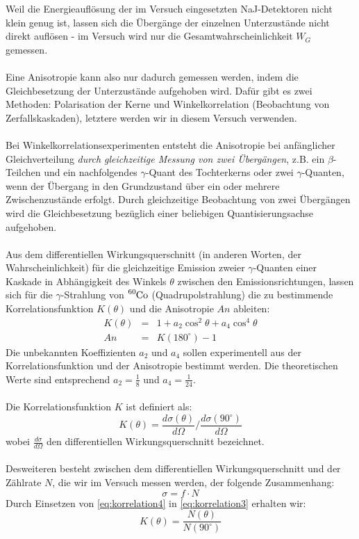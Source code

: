 \documentclass[a4paper,titlepage]{scrartcl}
\numberwithin{equation}{section}
\begin{document}
Weil die Energieauflösung der im Versuch eingesetzten NaJ-Detektoren nicht klein genug ist, lassen sich die Übergänge der einzelnen Unterzustände nicht direkt auflösen - im Versuch wird nur die Gesamtwahrscheinlichkeit $W_G$ gemessen.\\ \\
Eine Anisotropie kann also nur dadurch gemessen werden, indem die Gleichbesetzung der Unterzustände aufgehoben wird. Dafür gibt es zwei Methoden: Polarisation der Kerne und Winkelkorrelation (Beobachtung von Zerfallskaskaden), letztere werden wir in diesem Versuch verwenden.\\ \\
Bei Winkelkorrelationsexperimenten entsteht die Anisotropie bei anfänglicher Gleichverteilung \emph{durch gleichzeitige Messung von zwei Übergängen}, z.B. ein $\beta$-Teilchen und ein nachfolgendes $\gamma$-Quant des Tochterkerns oder zwei $\gamma$-Quanten, wenn der Übergang in den Grundzustand über ein oder mehrere Zwischenzustände erfolgt. Durch gleichzeitige Beobachtung von zwei Übergängen wird die Gleichbesetzung bezüglich einer beliebigen Quantisierungsachse aufgehoben.\\ \\
Aus dem differentiellen Wirkungsquerschnitt (in anderen Worten, der Wahrscheinlichkeit) für die gleichzeitige Emission zweier $\gamma$-Quanten einer Kaskade in Abhängigkeit des Winkels $\theta$ zwischen den Emissionsrichtungen, lassen sich für die $\gamma$-Strahlung von $\ce{^{60}Co}$ (Quadrupolstrahlung) die zu bestimmende Korrelationsfunktion $K(\theta)$ und die Anisotropie $An$ ableiten:
\begin{eqnarray}
\label{eq:korrelation1}
K(\theta)&=&1+a_2 \cos^2{\theta} + a_4 \cos^4{\theta}\\
\label{eq:korrelation2}
An&=&K(180^{\circ}) - 1
\end{eqnarray}
Die unbekannten Koeffizienten $a_2$ und $a_4$ sollen experimentell aus der Korrelationsfunktion und der Anisotropie bestimmt werden. Die theoretischen Werte sind entsprechend $a_2=\frac{1}{8}$ und $a_4=\frac{1}{24}$.\\ \\
Die Korrelationsfunktion $K$ ist definiert als:
\begin{equation}
\label{eq:korrelation3}
K(\theta)=\frac{d \sigma (\theta)}{d \Omega} / \frac{d \sigma (90^{\circ})}{d \Omega}
\end{equation}
wobei $\frac{d \sigma}{d \Omega}$ den differentiellen Wirkungsquerschnitt bezeichnet.\\ \\
Desweiteren besteht zwischen dem differentiellen Wirkungsquerschnitt und der Zählrate $N$, die wir im Versuch messen werden, der folgende Zusammenhang:
\begin{equation}
\label{eq:korrelation4}
\sigma=f \cdot N
\end{equation}
Durch Einsetzen von \ref{eq:korrelation4} in \ref{eq:korrelation3} erhalten wir:
\begin{equation}
\label{eq:korrelation5}
K(\theta)=\frac{N(\theta)}{N(90^{\circ})}
\end{equation}
\end{document}
